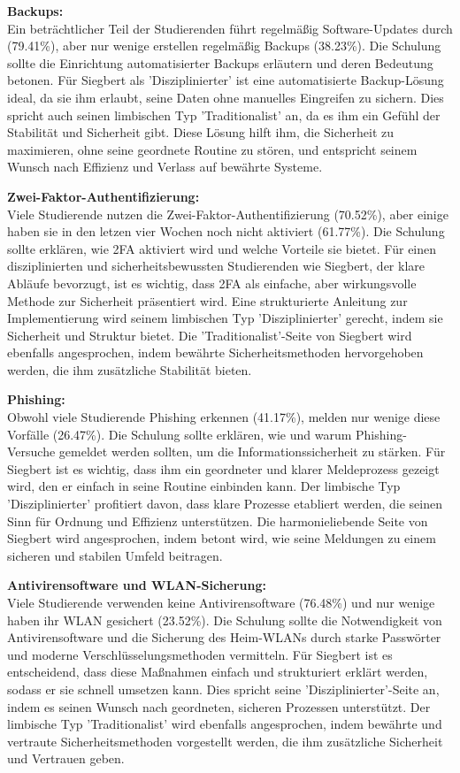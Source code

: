 \documentclass[german,report]{i1thesis}
\begin{document}
\textbf{Backups:}\\
Ein beträchtlicher Teil der Studierenden führt regelmäßig Software-Updates durch (79.41\%), aber nur wenige erstellen regelmäßig Backups (38.23\%). Die Schulung sollte die Einrichtung automatisierter Backups erläutern und deren Bedeutung betonen. Für Siegbert als 'Disziplinierter' ist eine automatisierte Backup-Lösung ideal, da sie ihm erlaubt, seine Daten ohne manuelles Eingreifen zu sichern. Dies spricht auch seinen limbischen Typ 'Traditionalist' an, da es ihm ein Gefühl der Stabilität und Sicherheit gibt. Diese Lösung hilft ihm, die Sicherheit zu maximieren, ohne seine geordnete Routine zu stören, und entspricht seinem Wunsch nach Effizienz und Verlass auf bewährte Systeme.

\textbf{Zwei-Faktor-Authentifizierung:}\\
Viele Studierende nutzen die Zwei-Faktor-Authentifizierung (70.52\%), aber einige haben sie in den letzen vier Wochen noch nicht aktiviert (61.77\%). Die Schulung sollte erklären, wie 2FA aktiviert wird und welche Vorteile sie bietet. Für einen disziplinierten und sicherheitsbewussten Studierenden wie Siegbert, der klare Abläufe bevorzugt, ist es wichtig, dass 2FA als einfache, aber wirkungsvolle Methode zur Sicherheit präsentiert wird. Eine strukturierte Anleitung zur Implementierung wird seinem limbischen Typ 'Disziplinierter' gerecht, indem sie Sicherheit und Struktur bietet. Die 'Traditionalist'-Seite von Siegbert wird ebenfalls angesprochen, indem bewährte Sicherheitsmethoden hervorgehoben werden, die ihm zusätzliche Stabilität bieten.

\textbf{Phishing:}\\
Obwohl viele Studierende Phishing erkennen (41.17\%), melden nur wenige diese Vorfälle (26.47\%). Die Schulung sollte erklären, wie und warum Phishing-Versuche gemeldet werden sollten, um die Informationssicherheit zu stärken. Für Siegbert ist es wichtig, dass ihm ein geordneter und klarer Meldeprozess gezeigt wird, den er einfach in seine Routine einbinden kann. Der limbische Typ 'Disziplinierter' profitiert davon, dass klare Prozesse etabliert werden, die seinen Sinn für Ordnung und Effizienz unterstützen. Die harmonieliebende Seite von Siegbert wird angesprochen, indem betont wird, wie seine Meldungen zu einem sicheren und stabilen Umfeld beitragen.

\textbf{Antivirensoftware und WLAN-Sicherung:}\\
Viele Studierende verwenden keine Antivirensoftware (76.48\%) und nur wenige haben ihr WLAN gesichert (23.52\%). Die Schulung sollte die Notwendigkeit von Antivirensoftware und die Sicherung des Heim-WLANs durch starke Passwörter und moderne Verschlüsselungsmethoden vermitteln. Für Siegbert ist es entscheidend, dass diese Maßnahmen einfach und strukturiert erklärt werden, sodass er sie schnell umsetzen kann. Dies spricht seine 'Disziplinierter'-Seite an, indem es seinen Wunsch nach geordneten, sicheren Prozessen unterstützt. Der limbische Typ 'Traditionalist' wird ebenfalls angesprochen, indem bewährte und vertraute Sicherheitsmethoden vorgestellt werden, die ihm zusätzliche Sicherheit und Vertrauen geben.
\end{document}

